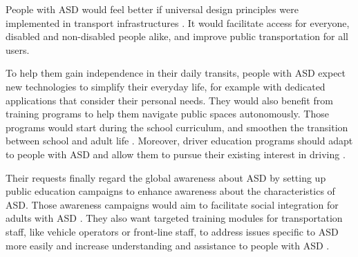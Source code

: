 People with ASD would feel better if universal design principles were implemented in transport infrastructures \cite{2020ExperiencesYoungAutistic}. It would facilitate access for everyone, disabled and non-disabled people alike, and improve public transportation for all users.

To help them gain independence in their daily transits, people with ASD expect new technologies to simplify their everyday life, for example with dedicated applications that consider their personal needs. They would also benefit from training programs to help them navigate public spaces autonomously. Those programs would start during the school curriculum, and smoothen the transition between school and adult life \cite{2015DetourRightPlace}. Moreover, driver education programs should adapt to people with ASD and allow them to pursue their existing interest in driving \cite{2015DetourRightPlace}. 

Their requests finally regard the global awareness about ASD by setting up public education campaigns to enhance awareness about the characteristics of ASD. Those awareness campaigns would aim to facilitate social integration for adults with ASD \cite{2015DetourRightPlace}. They also want targeted training modules for transportation staff, like vehicle operators or front-line staff, to address issues specific to ASD more easily and increase understanding and assistance to people with ASD \cite{2020ExperiencesYoungAutistic}. 

